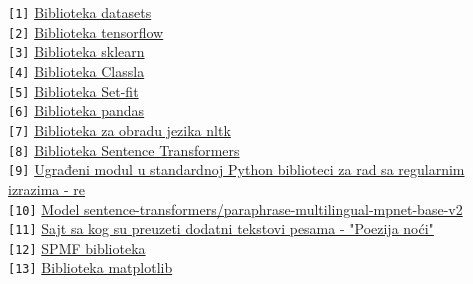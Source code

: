 \documentclass{article}
\begin{document}
\begin{flushleft}
\texttt{[1]}  \href{https://huggingface.co/docs/datasets/index}{Biblioteka 
datasets}\\
\texttt{[2]}  \href{https://www.tensorflow.org/overview}{Biblioteka tensorflow} \\
\texttt{[3]}  \href{https://scikit-learn.org/stable/}{Biblioteka sklearn} \\
\texttt{[4]}  \href{https://pypi.org/project/classla/}{Biblioteka Classla}  \\
\texttt{[5]}  \href{https://github.com/huggingface/setfit}{Biblioteka Set-fit}\\
\texttt{[6]}  \href{https://pandas.pydata.org/docs/reference/index.html#api}
{Biblioteka pandas } \\
\texttt{[7]}   \href{https://www.nltk.org/}{Biblioteka za obradu jezika nltk}\\
\texttt{[8]} \href{https://www.sbert.net/}{Biblioteka Sentence Transformers} \\
\texttt{[9]} \href{https://docs.python.org/3/howto/regex.html}{Ugrađeni modul u 
standardnoj Python biblioteci za rad sa regularnim izrazima - re} \\
\texttt{[10]}  \href{https://huggingface.co/sentence-transformers/paraphrase-multilingual-mpnet-base-v2}{Model sentence-transformers/paraphrase-multilingual-mpnet-base-v2} \\
\texttt{[11]}  \href{https://www.poezijanoci.com/domaca-poezija.html}{Sajt sa kog 
su preuzeti dodatni tekstovi pesama - "Poezija noći"} \\
\texttt{[12]} \href{https://www.philippe-fournier-viger.com/spmf/index.php?link=algorithms.php}{SPMF biblioteka}\\
\texttt{[13]} \href{https://matplotlib.org/stable/api/index}{Biblioteka matplotlib}\\
\end{flushleft}
\end{document}
